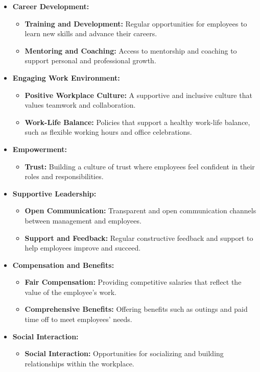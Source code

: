 \begin{itemize}
\item \textbf{Career Development:}
\begin{itemize}
    \item \textbf{Training and Development:} Regular opportunities for employees to learn new skills and advance their careers.
    \item \textbf{Mentoring and Coaching:} Access to mentorship and coaching to support personal and professional growth.
\end{itemize}


\item \textbf{Engaging Work Environment:}
\begin{itemize}
    \item \textbf{Positive Workplace Culture:} A supportive and inclusive culture that values teamwork and collaboration.
    \item \textbf{Work-Life Balance:} Policies that support a healthy work-life balance, such as flexible working hours and office celebrations.
\end{itemize}

\item \textbf{Empowerment:}
\begin{itemize}
    \item \textbf{Trust:} Building a culture of trust where employees feel confident in their roles and responsibilities.
\end{itemize}

\item \textbf{Supportive Leadership:}
\begin{itemize}
    \item \textbf{Open Communication:} Transparent and open communication channels between management and employees.
    \item \textbf{Support and Feedback:} Regular constructive feedback and support to help employees improve and succeed.
\end{itemize}

\item \textbf{Compensation and Benefits:}
\begin{itemize}
    \item \textbf{Fair Compensation:} Providing competitive salaries that reflect the value of the employee's work.
    \item \textbf{Comprehensive Benefits:} Offering benefits such as outings and paid time off to meet employees' needs.
\end{itemize}

\item \textbf{Social Interaction:}
\begin{itemize}
    \item \textbf{Social Interaction:} Opportunities for socializing and building relationships within the workplace.
\end{itemize}
\end{itemize}